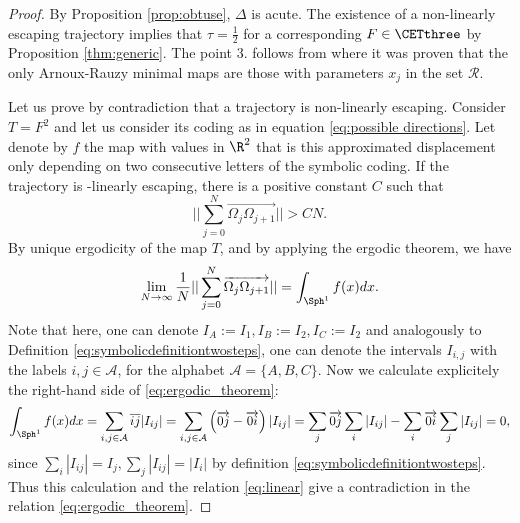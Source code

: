\documentclass[12pt]{article}
\theoremstyle{definition}
\begin{document}
\begin{proof}
By Proposition \ref{prop:obtuse}, $\Delta$ is acute. The existence of a non-linearly escaping trajectory implies that $\tau=\frac{1}{2}$ for a corresponding $F \in \CETthree$ by Proposition \ref{thm:generic}. The point 3. follows from \cite{AR91} where it was proven that the only Arnoux-Rauzy minimal maps are those with parameters $x_j$ in the set $\mathcal{R}$.

Let us prove by contradiction that a trajectory is non-linearly escaping. Consider $T = F^2$ and let us consider its coding as in equation \eqref{eq:possible directions}. Let denote by $f$ the map with values in $\R^2$ that is this approximated displacement only depending on two consecutive letters of the symbolic coding. If the trajectory is -linearly escaping, there is a positive constant $C$ such that 
\begin{equation}\label{eq:linear}
\vert \vert \sum_{j=0}^{N} \overrightarrow {\Omega_j \Omega_{j+1}}\vert \vert > CN.
\end{equation}
By unique ergodicity of the map $T$, and by applying the ergodic theorem, we have
\begin{equation}\label{eq:ergodic_theorem}
\lim_{N\to \infty} \frac{1}{N}\vert \vert \sum_{j=0}^{N} \overrightarrow {\Omega_j \Omega_{j+1}}\vert \vert = \int_{\Sph^1}f(x) dx.
\end{equation}
Note that here, one can denote $I_A:=I_1, I_B:=I_2, I_C:=I_2$ and analogously to Definition \eqref{eq:symbolicdefinitiontwosteps}, one can denote the intervals $I_{i,j}$ with the labels $i,j \in \mathcal{A}$, for the alphabet $\mathcal{A}=\{A,B,C\}$. Now we calculate explicitely the right-hand side of \eqref{eq:ergodic_theorem}:
\begin{equation*}
\int_{\Sph^1} f(x) dx = \sum_{i,j \in \mathcal{A}} \overline{i j} |I_{ij}|=
 \sum_{i,j \in \mathcal{A}} \left(
\overrightarrow{0j}-\overrightarrow{0i}
 \right)
  |I_{ij}|= \sum_j \overrightarrow{0j} \sum_i |I_{ij}| - \sum_{i} \overrightarrow{0i} \sum_j 
|I_{ij}| = 0, 
\end{equation*}
since $\sum_i |I_{ij}|=I_j, \sum_j |I_{ij}|=|I_i|$ by definition \eqref{eq:symbolicdefinitiontwosteps}.  Thus this calculation and the relation \eqref{eq:linear} give a contradiction in the relation \eqref{eq:ergodic_theorem}.
\end{proof}
\end{document}

